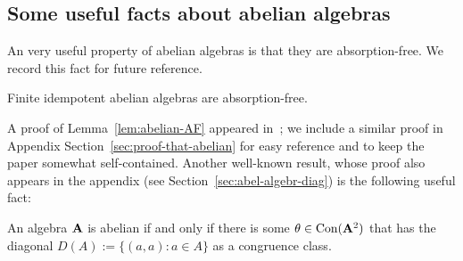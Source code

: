 
\subsection{Some useful facts about abelian algebras}
\label{sec:facts-about-abelian}

An very useful property of abelian algebras is that they are absorption-free.
We record this fact for future reference.
\begin{lemma}
  \label{lem:abelian-AF}
  Finite idempotent abelian algebras are absorption-free.
\end{lemma}
A proof of Lemma~\ref{lem:abelian-AF} appeared in~\cite[Lem~4.1]{MR3374664};
we include a similar proof in Appendix Section~\ref{sec:proof-that-abelian} for easy
reference and to keep the paper somewhat self-contained.
Another well-known result, whose proof also appears in the appendix
(see Section~\ref{sec:abel-algebr-diag}) is the following useful fact:
\begin{lemma}
  \label{lem:diagonal-cong-class}
 An algebra $\mathbf{A}$ is abelian if and only if there is some 
 $\theta \in \operatorname{Con} (\mathbf{A}^2)$ that has the diagonal $D(A):= \{(a,a): a \in A\}$ 
 as a congruence class.
\end{lemma}



